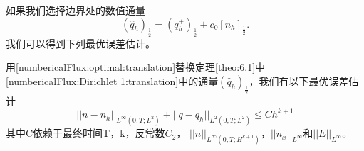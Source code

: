 如果我们选择边界处的数值通量
\begin{equation}
    (\hat{q}_h)_{\frac{1}{2}} = (q_h^+)_{\frac{1}{2}} + c_0[n_h]_{\frac{1}{2}}. \label{numbericalFlux:optimal:translation}
\end{equation}
我们可以得到下列最优误差估计。

\begin{theorem}
    用\eqref{numbericalFlux:optimal:translation}替换定理\eqref{theo:6.1}中\eqref{numbericalFlux:Dirichlet 1:translation}中的通量$(\hat{q}_h)_{\frac{1}{2}}$，我们有以下最优误差估计
    \begin{equation}
        ||n-n_h||_{L^{\infty}(0,T;L^2)} + ||q - q_h||_{L^2(0,T;L^2)} \leq C h^{k+1}
    \end{equation}
    其中C依赖于最终时间T，k，反常数$C_2$， $||n||_{L^{\infty}(0,T;H^{k+1})}$，$||n_x||_{L^{\infty}}$和$||E||_{L^{\infty}}$。
\end{theorem}
